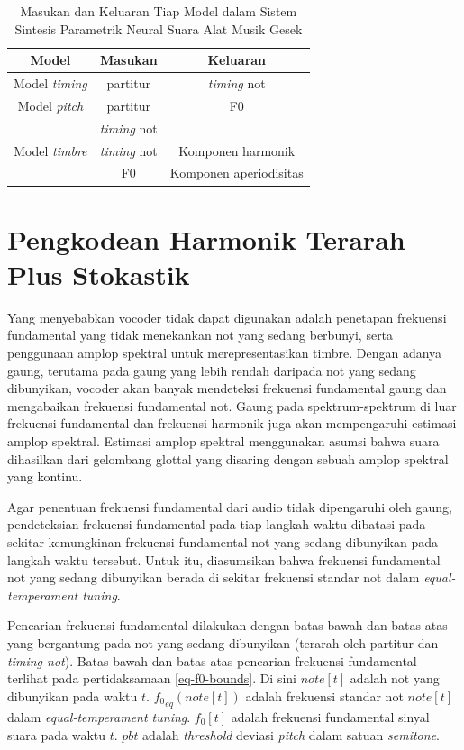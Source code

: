 \begin{table}[h]
    \centering
    \caption{Masukan dan Keluaran Tiap Model dalam Sistem Sintesis Parametrik Neural Suara Alat Musik Gesek }\label{tab-models-in-out}
    \begin{tabular}{ |c|c|c| } 
     \hline
     Model & Masukan & Keluaran \\
     \hline 
     Model \textit{timing} & partitur & \textit{timing} not  \\ 
     \hline
     Model \textit{pitch} & partitur & F0 \\ 
      & \textit{timing} not  & \\ 
     \hline
     Model \textit{timbre} & \textit{timing} not & Komponen harmonik \\ 
      & F0& Komponen aperiodisitas\\ 
     \hline
    \end{tabular}
\end{table}

\section{Pengkodean Harmonik Terarah Plus Stokastik}

Yang menyebabkan vocoder tidak dapat digunakan adalah penetapan frekuensi fundamental yang tidak menekankan not yang sedang berbunyi, serta penggunaan amplop spektral untuk merepresentasikan timbre. Dengan adanya gaung, terutama pada gaung yang lebih rendah daripada not yang sedang dibunyikan, vocoder akan banyak mendeteksi frekuensi fundamental gaung dan mengabaikan frekuensi fundamental not. Gaung pada spektrum-spektrum di luar frekuensi fundamental dan frekuensi harmonik juga akan mempengaruhi estimasi amplop spektral. Estimasi amplop spektral menggunakan asumsi bahwa suara dihasilkan dari gelombang glottal yang disaring dengan sebuah amplop spektral yang kontinu.

Agar penentuan frekuensi fundamental dari audio tidak dipengaruhi oleh gaung, pendeteksian frekuensi fundamental pada tiap langkah waktu dibatasi pada sekitar kemungkinan frekuensi fundamental not yang sedang dibunyikan pada langkah waktu tersebut. Untuk itu, diasumsikan bahwa frekuensi fundamental not yang sedang dibunyikan berada di sekitar frekuensi standar not dalam \textit{equal-temperament tuning}.

Pencarian frekuensi fundamental dilakukan dengan batas bawah dan batas atas yang bergantung pada not yang sedang dibunyikan (terarah oleh partitur dan \textit{timing not}). Batas bawah dan batas atas pencarian frekuensi fundamental terlihat pada pertidaksamaan \ref{eq-f0-bounds}. Di sini $note[t]$ adalah not yang dibunyikan pada waktu $t$. ${f_0}_{eq}(note[t])$ adalah frekuensi standar not $note[t]$ dalam \textit{equal-temperament tuning}. $f_0[t]$ adalah frekuensi fundamental sinyal suara pada waktu $t$. $pbt$ adalah \textit{threshold} deviasi \textit{pitch} dalam satuan \textit{semitone}.

